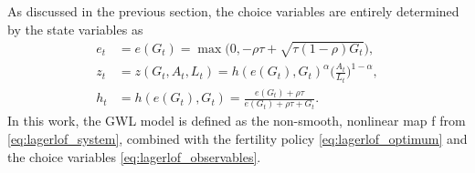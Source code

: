 \documentclass[a4paper,fleqn]{cas-sc}
\begin{document}
As discussed in the previous section, the choice variables are entirely determined by the state variables as 
%
\begin{subequations}\label{eq:lagerlof_observables} 
    \begin{align} 
        e_t &= e(G_t) = \max\!\Big(0,-\rho\tau+\sqrt{\tau(1-\rho)G_t}\Big), \label{eq:lagerlof_education} \\
        z_t &= z(G_t,A_t,L_t) = h(e(G_t),G_t)^{\alpha} \bigg(\frac{A_t}{L_t}\bigg)^{1-\alpha}, \label{eq:lagerlof_income} \\
        h_t &= h(e(G_t),G_t) = \frac{e(G_t)+\rho\tau}{e(G_t)+\rho\tau+G_t}. \label{eq:lagerlof_capital}
    \end{align} 
\end{subequations} 
%
In this work, the GWL model is defined as the non-smooth, nonlinear map f from \eqref{eq:lagerlof_system}, combined with the fertility policy \eqref{eq:lagerlof_optimum} and the choice variables \eqref{eq:lagerlof_observables}.
\end{document}
